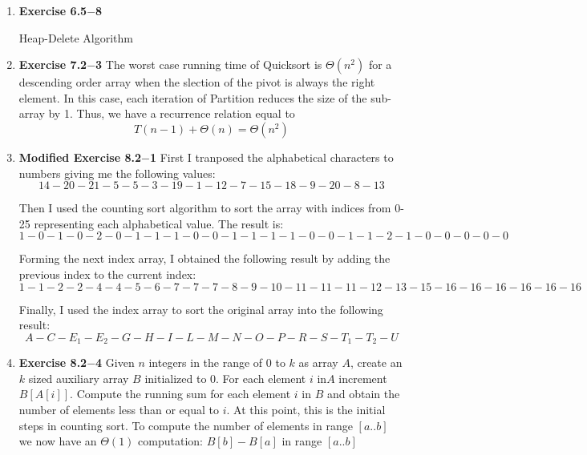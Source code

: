 \documentclass[a4paper,11pt,oneside]{book}
\begin{document}
\noindent{}
\normalsize

\begin{enumerate}
  \item {\textbf{Exercise 6.5$-$8}} 
  \begin{algorithm}
    \caption{Heap-Delete Algorithm}
    \begin{algorithmic}[1]
        \EndFunction
    \end{algorithmic}
\end{algorithm}

  \item {\textbf{Exercise 7.2$-$3}}
  The worst case running time of Quicksort is $\Theta\left(n^2\right)$ for a descending order array when the slection of the pivot is always the right element. 
  In this case, each iteration of Partition reduces the size of the sub-array by 1. Thus, we have a recurrence relation equal to 
  \[T(n-1)+\Theta(n) = \Theta(n^2)\]

  \item {\textbf{Modified Exercise 8.2$-$1}} First I tranposed the alphabetical characters to numbers giving me the following values:
  $$ 14-20-21-5-5-3-19-1-12-7-15-18-9-20-8-13$$

  Then I used the counting sort algorithm to sort the array with indices from 0-25 representing each alphabetical value. The result is:
  $$ 1-0-1-0-2-0-1-1-1-0-0-1-1-1-1-0-0-1-1-2-1-0-0-0-0-0$$

  Forming the next index array, I obtained the following result by adding the previous index to the current index:
  $$ 1-1-2-2-4-4-5-6-7-7-7-8-9-10-11-11-11-12-13-15-16-16-16-16-16-16$$

  Finally, I used the index array to sort the original array into the following result:
  $$ A-C-E_1-E_2-G-H-I-L-M-N-O-P-R-S-T_1-T_2-U$$
  
  \item {\textbf{Exercise 8.2$-$4}} Given $n$ integers in the range of 0 to $k$ as array $A$, create an $k$ sized auxiliary array $B$ initialized to $0$.
  For each element $i \text{ in} A$ increment $B[A[i]]$. Compute the running sum for each element $i$ in $B$ 
  and obtain the number of elements less than or equal to $i$. At this point, this is the initial steps in counting sort.
  To compute the number of elements in range $[a..b]$ we now have an $\Theta(1)$ computation: $B[b] - B[a]$
  in range $[a..b]$   
  

\end{enumerate}
\end{document}
